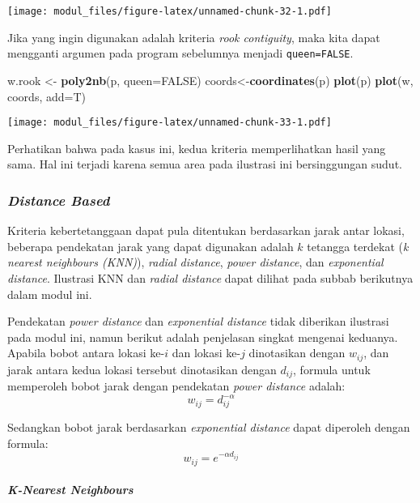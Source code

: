 \documentclass[
]{book}
\newenvironment{Shaded}{\begin{snugshade}}{\end{snugshade}}
\newcommand{\DataTypeTok}[1]{\textcolor[rgb]{0.13,0.29,0.53}{#1}}
\newcommand{\KeywordTok}[1]{\textcolor[rgb]{0.13,0.29,0.53}{\textbf{#1}}}
\newcommand{\NormalTok}[1]{#1}
\newcommand{\OtherTok}[1]{\textcolor[rgb]{0.56,0.35,0.01}{#1}}
\newcommand{\StringTok}[1]{\textcolor[rgb]{0.31,0.60,0.02}{#1}}
\begin{document}
\texttt{[image: modul\_files/figure-latex/unnamed-chunk-32-1.pdf]}

Jika yang ingin digunakan adalah kriteria \emph{rook contiguity}, maka kita dapat mengganti argumen pada program sebelumnya menjadi \texttt{queen=FALSE}.

\begin{Shaded}
\begin{Highlighting}[]
\NormalTok{w.rook \textless{}{-}}\StringTok{ }\KeywordTok{poly2nb}\NormalTok{(p, }\DataTypeTok{queen=}\OtherTok{FALSE}\NormalTok{)}
\NormalTok{coords\textless{}{-}}\KeywordTok{coordinates}\NormalTok{(p)}
\KeywordTok{plot}\NormalTok{(p)}
\KeywordTok{plot}\NormalTok{(w, coords, }\DataTypeTok{add=}\NormalTok{T)}
\end{Highlighting}
\end{Shaded}

\texttt{[image: modul\_files/figure-latex/unnamed-chunk-33-1.pdf]}

Perhatikan bahwa pada kasus ini, kedua kriteria memperlihatkan hasil yang sama. Hal ini terjadi karena semua area pada ilustrasi ini bersinggungan sudut.

\hypertarget{distance-based}{%
\subsubsection{\texorpdfstring{\emph{Distance Based}}{Distance Based}}\label{distance-based}}

Kriteria kebertetanggaan dapat pula ditentukan berdasarkan jarak antar lokasi, beberapa pendekatan jarak yang dapat digunakan adalah \(k\) tetangga terdekat (\emph{k nearest neighbours (KNN)}), \emph{radial distance}, \emph{power distance}, dan \emph{exponential distance}. Ilustrasi KNN dan \emph{radial distance} dapat dilihat pada subbab berikutnya dalam modul ini.

Pendekatan \emph{power distance} dan \emph{exponential distance} tidak diberikan ilustrasi pada modul ini, namun berikut adalah penjelasan singkat mengenai keduanya. Apabila bobot antara lokasi ke-\(i\) dan lokasi ke-\(j\) dinotasikan dengan \(w_{ij}\), dan jarak antara kedua lokasi tersebut dinotasikan dengan \(d_{ij}\), formula untuk memperoleh bobot jarak dengan pendekatan \emph{power distance} adalah:
\[
w_{ij}=d_{ij}^{-\alpha}
\]

Sedangkan bobot jarak berdasarkan \emph{exponential distance} dapat diperoleh dengan formula:
\[
w_{ij}=e^{{-\alpha}d_{ij}}
\]

\hypertarget{k-nearest-neighbours}{%
\paragraph{\texorpdfstring{\emph{K-Nearest Neighbours}}{K-Nearest Neighbours}}\label{k-nearest-neighbours}}
\end{document}
